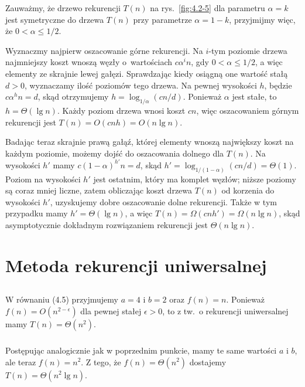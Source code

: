 Zauważmy, że drzewo rekurencji $T(n)$ na rys.~\ref{fig:4.2-5} dla parametru $\alpha=k$ jest symetryczne do drzewa $T(n)$ przy parametrze $\alpha=1-k$, przyjmijmy więc, że $0<\alpha\le1/2$.

Wyznaczmy najpierw oszacowanie górne rekurencji. Na $i$-tym poziomie drzewa najmniejszy koszt wnoszą węzły o~wartościach $c\alpha^in$, gdy $0<\alpha\le1/2$, a więc elementy ze skrajnie lewej gałęzi. Sprawdzając kiedy osiągną one wartość stałą $d>0$, wyznaczamy ilość poziomów tego drzewa. Na pewnej wysokości $h$, będzie $c\alpha^hn=d$, skąd otrzymujemy $h=\log_{1/\alpha}(cn/d)$. Ponieważ $\alpha$ jest stałe, to $h=\Theta(\lg n)$. Każdy poziom drzewa wnosi koszt $cn$, więc oszacowaniem górnym rekurencji jest $T(n)=O(cnh)=O(n\lg n)$.

Badając teraz skrajnie prawą gałąź, której elementy wnoszą największy koszt na każdym poziomie, możemy dojść do oszacowania dolnego dla $T(n)$. Na wysokości $h'$ mamy $c(1-\alpha)^{h'}n=d$, skąd $h'=\log_{1/(1-\alpha)}(cn/d)=\Theta(1)$. Poziom na wysokości $h'$ jest ostatnim, który ma komplet węzłów; niższe poziomy są coraz mniej liczne, zatem obliczając koszt drzewa $T(n)$ od korzenia do wysokości $h'$, uzyskujemy dobre oszacowanie dolne rekurencji. Także w tym przypadku mamy $h'=\Theta(\lg n)$, a więc $T(n)=\Omega(cnh')=\Omega(n\lg n)$, skąd asymptotycznie dokładnym rozwiązaniem rekurencji jest $\Theta(n\lg n)$.

\section{Metoda rekurencji uniwersalnej}

\subsection{} %

\subsubsection{}
W równaniu (4.5) przyjmujemy $a=4$ i $b=2$ oraz $f(n)=n$. Ponieważ $f(n)=O(n^{2-\epsilon})$ dla pewnej stałej $\epsilon>0$, to z tw.~o rekurencji uniwersalnej mamy $T(n)=\Theta(n^2)$.

\subsubsection{}
Postępując analogicznie jak w poprzednim punkcie, mamy te same wartości $a$ i $b$, ale teraz $f(n)=n^2$. Z tego, że $f(n)=\Theta(n^2)$ dostajemy $T(n)=\Theta(n^2\lg n)$.

